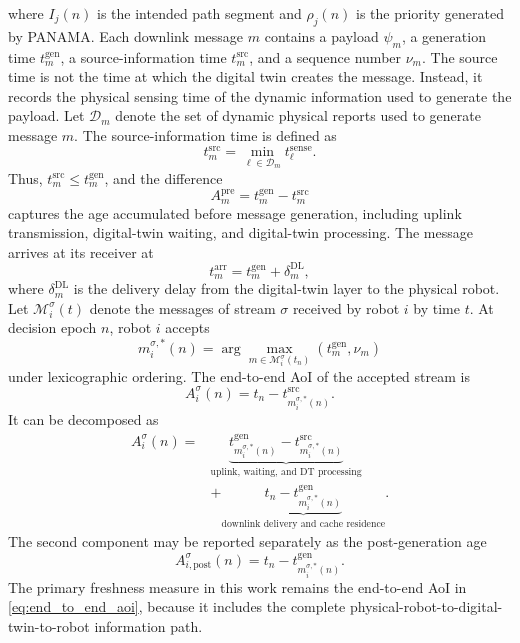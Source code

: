 \IfFileExists{IEEEtran.cls}{\documentclass[conference]{IEEEtran}}{\documentclass[10pt,twocolumn]{article}}
\begin{document}
where \(I_j(n)\) is the intended path segment and \(\rho_j(n)\) is the priority generated by PANAMA. Each downlink message \(m\) contains a payload \(\psi_m\), a generation time \(t_m^{\mathrm{gen}}\), a source-information time \(t_m^{\mathrm{src}}\), and a sequence number \(\nu_m\). The source time is not the time at which the digital twin creates the message. Instead, it records the physical sensing time of the dynamic information used to generate the payload. Let \(\mathcal{D}_m\) denote the set of dynamic physical reports used to generate message \(m\). The source-information time is defined as \begin{equation} t_m^{\mathrm{src}} = \min_{\ell\in\mathcal{D}_m} t_{\ell}^{\mathrm{sense}}. \label{eq:message_provenance_time} \end{equation} Thus, \(t_m^{\mathrm{src}}\leq t_m^{\mathrm{gen}}\), and the difference \begin{equation} A_m^{\mathrm{pre}} = t_m^{\mathrm{gen}} - t_m^{\mathrm{src}} \label{eq:pregeneration_age} \end{equation} captures the age accumulated before message generation, including uplink transmission, digital-twin waiting, and digital-twin processing. The message arrives at its receiver at \begin{equation} t_m^{\mathrm{arr}} = t_m^{\mathrm{gen}} + \delta_m^{\mathrm{DL}}, \label{eq:downlink_arrival} \end{equation} where \(\delta_m^{\mathrm{DL}}\) is the delivery delay from the digital-twin layer to the physical robot. Let \(\mathcal{M}_i^\sigma(t)\) denote the messages of stream \(\sigma\) received by robot \(i\) by time \(t\). At decision epoch \(n\), robot \(i\) accepts \begin{equation} m_i^{\sigma,*}(n) = \arg\max_{m\in\mathcal{M}_i^\sigma(t_n)} \left( t_m^{\mathrm{gen}}, \nu_m \right) \label{eq:accepted_message} \end{equation} under lexicographic ordering. The end-to-end AoI of the accepted stream is \begin{equation} A_i^\sigma(n) = t_n - t_{m_i^{\sigma,*}(n)}^{\mathrm{src}}. \label{eq:end_to_end_aoi} \end{equation} It can be decomposed as \begin{align} A_i^\sigma(n) = &\underbrace{ t_{m_i^{\sigma,*}(n)}^{\mathrm{gen}} - t_{m_i^{\sigma,*}(n)}^{\mathrm{src}} }_{\text{uplink, waiting, and DT processing}} \nonumber\\ &+ \underbrace{ t_n - t_{m_i^{\sigma,*}(n)}^{\mathrm{gen}} }_{\text{downlink delivery and cache residence}}. \label{eq:aoi_decomposition} \end{align} The second component may be reported separately as the post-generation age \begin{equation} A_{i,\mathrm{post}}^\sigma(n) = t_n - t_{m_i^{\sigma,*}(n)}^{\mathrm{gen}}. \label{eq:postgeneration_age} \end{equation} The primary freshness measure in this work remains the end-to-end AoI in \eqref{eq:end_to_end_aoi}, because it includes the complete physical-robot-to-digital-twin-to-robot information path.
\end{document}

